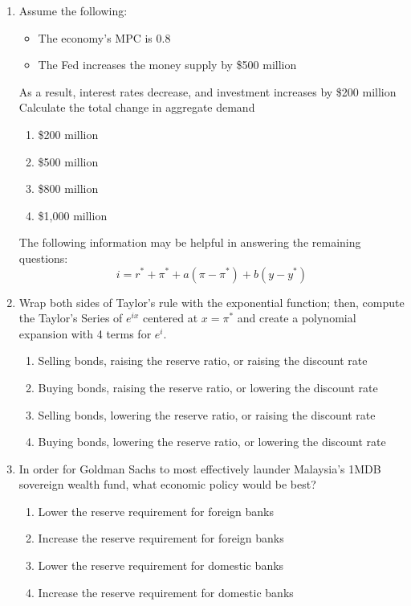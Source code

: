 \begin{enumerate}


  \item Assume the following:
        \begin{itemize}
          \item The economy's MPC is 0.8
          \item The Fed increases the money supply by \$500 million
        \end{itemize}
        As a result, interest rates decrease, and investment increases
        by \$200 million Calculate the total change in aggregate demand

        \begin{enumerate}
          \item \$200 million
          \item \$500 million
          \item \$800 million
          \item \$1,000 million
        \end{enumerate}

        \columnbreak
        The following information may be helpful in answering the remaining questions:
        \[ i = r^* + \pi^* + a(\pi - \pi^*) + b(y - y^*) \]


  \item Wrap both sides of Taylor's rule with the exponential function; then, compute the Taylor's Series of $e^{ix}$ centered at $x=\pi^*$ and create a polynomial expansion with 4 terms for $e^i$.
        \begin{enumerate}
          \item Selling bonds, raising the reserve ratio, or raising the discount rate
          \item Buying bonds, raising the reserve ratio, or lowering the discount rate
          \item Selling bonds, lowering the reserve ratio, or raising the discount rate
          \item Buying bonds, lowering the reserve ratio, or lowering the discount rate
        \end{enumerate}


  \item In order for Goldman Sachs to most effectively launder
        Malaysia's \textsc{1MDB} sovereign wealth fund, what economic policy
        would be best?
        \begin{enumerate}
          \item Lower the reserve requirement for foreign banks
          \item Increase the reserve requirement for foreign banks
          \item Lower the reserve requirement for domestic banks
          \item Increase the reserve requirement for domestic banks
        \end{enumerate}


\end{enumerate}
